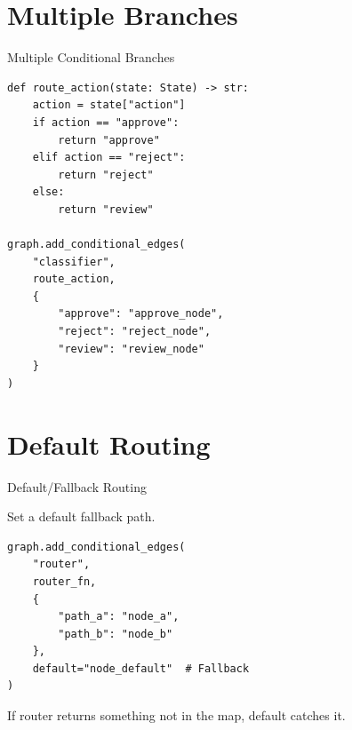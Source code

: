\documentclass[aspectratio=169,11pt]{beamer}
\begin{document}
\section{Multiple Branches}
\begin{frame}[fragile,t]{Multiple Conditional Branches}
\vspace{0.05cm}

\begin{codebox}
\begin{lstlisting}
def route_action(state: State) -> str:
    action = state["action"]
    if action == "approve":
        return "approve"
    elif action == "reject":
        return "reject"
    else:
        return "review"

graph.add_conditional_edges(
    "classifier",
    route_action,
    {
        "approve": "approve_node",
        "reject": "reject_node",
        "review": "review_node"
    }
)
\end{lstlisting}
\end{codebox}
\end{frame}

\section{Default Routing}
\begin{frame}[fragile,t]{Default/Fallback Routing}
\vspace{0.1cm}

\begin{conceptbox}
Set a default fallback path.
\end{conceptbox}

\vspace{0.1cm}

\begin{codebox}
\begin{lstlisting}
graph.add_conditional_edges(
    "router",
    router_fn,
    {
        "path_a": "node_a",
        "path_b": "node_b"
    },
    default="node_default"  # Fallback
)
\end{lstlisting}
\end{codebox}

\vspace{0.15cm}

{\footnotesize If router returns something not in the map, default catches it.}
\end{frame}
\end{document}
